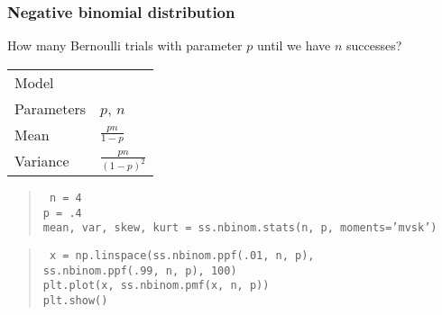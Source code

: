 \documentclass[t]{beamer}
\begin{document}
\begin{frame}
  \frametitle{Negative binomial distribution}

  How many Bernoulli trials with parameter $p$ until we have $n$
  successes?

  \begin{tabular}{l|l}
    Model & \\[1mm]
    Parameters & $p$, $n$\\[1mm]
    Mean & $\frac{pn}{1-p}$\\[1mm]
    Variance & $\frac{pn}{(1-p)^2}$
  \end{tabular}

  \vspace{6mm}
   {
    \begin{quote}
      \tt
      n = 4\\
      p = .4\\
      mean, var, skew, kurt = ss.nbinom.stats(n, p, moments='mvsk')
    \end{quote}
    
  }
   {
    \begin{quote}
      \tt
      x = np.linspace(ss.nbinom.ppf(.01, n, p), \\
      \hspace{1cm} ss.nbinom.ppf(.99, n, p), 100) \\
      plt.plot(x, ss.nbinom.pmf(x, n, p)) \\
      plt.show()
    \end{quote}

    \note {  }
  }


\end{frame}
\end{document}

